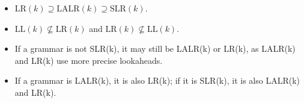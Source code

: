 \begin{itemize}
    \item \(\text{LR}(k) \supseteq \text{LALR}(k) \supseteq \text{SLR}(k)\).
    \item \(\text{LL}(k) \not\subseteq \text{LR}(k)\) and \(\text{LR}(k) \not\subseteq \text{LL}(k)\).
    \item If a grammar is not SLR(k), it may still be LALR(k) or LR(k), as LALR(k) and LR(k) use more precise lookaheads.
    \item If a grammar is LALR(k), it is also LR(k); if it is SLR(k), it is also LALR(k) and LR(k).
\end{itemize}

